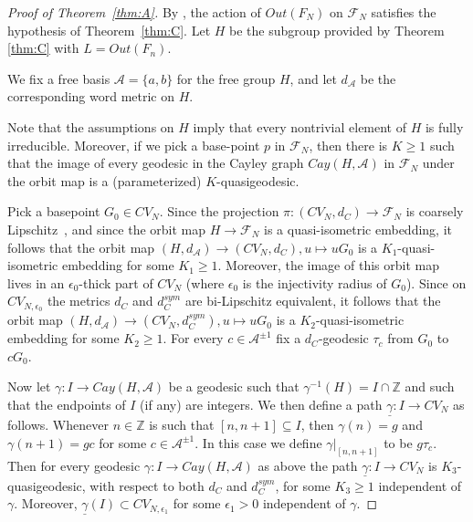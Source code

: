\documentclass[11pt,letterpaper]{amsart}
\theoremstyle{definition}
\theoremstyle{remark}
\begin{document}
\begin{proof}[Proof of Theorem~\ref{thm:A}]
By \cite{BF}, the action of $Out(F_N)$ on $\mathcal F_N$ satisfies the hypothesis of Theorem~\ref{thm:C}. Let $H$ be the subgroup provided by Theorem \ref{thm:C} with $L=Out(F_n)$.

We fix a free basis $\mathcal A=\{a,b\}$ for the free group $H$, and let $d_\mathcal A$ be the corresponding word metric on $H$. 

Note that the assumptions on $H$ imply that every nontrivial element of $H$ is fully irreducible.  Moreover, if we pick a base-point $p$ in $\mathcal F_N$, then there is $K\ge 1$ such that the image of every geodesic in the Cayley graph $Cay(H,\mathcal A)$ in $\mathcal F_N$ under the orbit map is a (parameterized) $K$-quasigeodesic.



 Pick a basepoint $G_0\in CV_N$.
Since the projection $\pi:(CV_N,d_C)\to \mathcal F_N$ is coarsely Lipschitz~\cite{BF}, and since the orbit map $H\to \mathcal F_N$ is a quasi-isometric embedding, it follows that the orbit map $(H,d_\mathcal A)\to (CV_N,d_C), u\mapsto u G_0$ is a $K_1$-quasi-isometric embedding for some $K_1\ge 1$. Moreover, the image of this orbit map lives in an $\epsilon_0$-thick part of $CV_N$ (where $\epsilon_0$ is the injectivity radius of $G_0$). Since on $CV_{N,\epsilon_0}$ the metrics $d_C$ and $d_C^{sym}$ are bi-Lipschitz equivalent, it follows that the orbit map $(H,d_\mathcal A)\to (CV_N,d_C^{sym}), u\mapsto u G_0$ is a $K_2$-quasi-isometric embedding for some $K_2\ge 1$.
For every $c\in \mathcal{A}^{\pm 1}$ fix a $d_C$-geodesic $\tau_c$ from $G_0$ to $cG_0$. 

Now let $\gamma: I\to Cay(H,\mathcal A)$ be a geodesic such that $\gamma^{-1}(H)=I\cap \mathbb Z$ and such that the endpoints of $I$ (if any) are integers. We then define a path $\underline{\gamma}:I\to CV_N$ as follows. Whenever $n\in \mathbb Z$ is such that $[n,n+1]\subseteq I$, then $\gamma(n)=g$ and $\gamma(n+1)=gc$ for some $c\in \mathcal A^{\pm 1}$. In this case we define $\gamma|_{[n,n+1]}$ to be $g\tau_c$.  Then for every geodesic $\gamma: I\to Cay(H,\mathcal A)$ as above the path $\underline{\gamma}:I\to CV_N$ is $K_3$-quasigeodesic, with respect to both $d_C$ and $d_C^{sym}$, for some $K_3\ge 1$ independent of $\gamma$. Moreover, $\underline{\gamma}(I)\subset CV_{N,\epsilon_1}$ for some $\epsilon_1>0$ independent of $\gamma$.



\end{proof}
\end{document}
